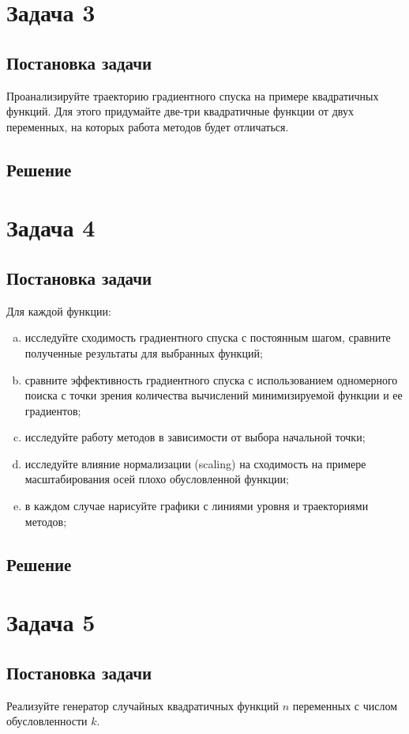 \documentclass[12pt, a4paper, oneside]{article}
\begin{document}
	\section*{Задача 3}
	\subsection*{Постановка задачи}
	Проанализируйте траекторию градиентного спуска на примере квадратичных функций. Для этого придумайте две-три квадратичные функции от двух переменных, на которых работа методов будет отличаться.
	\subsection*{Решение}
	\section*{Задача 4}
	\subsection*{Постановка задачи}
	Для каждой функции:
	\begin{enumerate}[(a)]
		\item исследуйте сходимость градиентного спуска с постоянным шагом, сравните полученные результаты для выбранных функций;
		\item сравните эффективность градиентного спуска с использованием одномерного поиска с точки зрения количества вычислений минимизируемой функции и ее градиентов;
		\item исследуйте работу методов в зависимости от выбора начальной точки;
		\item исследуйте влияние нормализации (scaling) на сходимость на примере масштабирования осей плохо обусловленной функции;
		\item в каждом случае нарисуйте графики с линиями уровня и траекториями методов;
	\end{enumerate}
	\subsection*{Решение}
	\section*{Задача 5}
	\subsection*{Постановка задачи}
	Реализуйте генератор случайных квадратичных функций $n$ переменных с числом обусловленности $k$.
\end{document}
